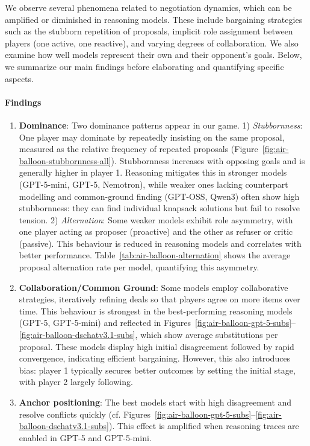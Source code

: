 \documentclass[../main.tex]{subfiles}
\begin{document}
We observe several phenomena related to negotiation dynamics, which can be amplified or diminished in reasoning models. These include bargaining strategies such as the stubborn repetition of proposals, implicit role assignment between players (one active, one reactive), and varying degrees of collaboration. We also examine how well models represent their own and their opponent’s goals. Below, we summarize our main findings before elaborating and quantifying specific aspects.

\paragraph{Findings}
\begin{enumerate}
    \item \textbf{Dominance}: Two dominance patterns appear in our game.  
    1) \emph{Stubbornness}: One player may dominate by repeatedly insisting on the same proposal, measured as the relative frequency of repeated proposals (Figure~\ref{fig:air-balloon-stubbornness-all}). Stubbornness increases with opposing goals and is generally higher in player 1. Reasoning mitigates this in stronger models (GPT-5-mini, GPT-5, Nemotron), while weaker ones lacking counterpart modelling and common-ground finding (GPT-OSS, Qwen3) often show high stubbornness: they can find individual knapsack solutions but fail to resolve tension.  
    2) \emph{Alternation}: Some weaker models exhibit role asymmetry, with one player acting as proposer (proactive) and the other as refuser or critic (passive). This behaviour is reduced in reasoning models and correlates with better performance. Table~\ref{tab:air-balloon-alternation} shows the average proposal alternation rate per model, quantifying this asymmetry.
    \item \textbf{Collaboration/Common Ground}: Some models employ collaborative strategies, iteratively refining deals so that players agree on more items over time. This behaviour is strongest in the best-performing reasoning models (GPT-5, GPT-5-mini) and reflected in Figures~\ref{fig:air-balloon-gpt-5-subs}--\ref{fig:air-balloon-dschatv3.1-subs}, which show average substitutions per proposal. These models display high initial disagreement followed by rapid convergence, indicating efficient bargaining. However, this also introduces bias: player 1 typically secures better outcomes by setting the initial stage, with player 2 largely following.
    \item \textbf{Anchor positioning}: The best models start with high disagreement and resolve conflicts quickly (cf. Figures~\ref{fig:air-balloon-gpt-5-subs}--\ref{fig:air-balloon-dschatv3.1-subs}). This effect is amplified when reasoning traces are enabled in GPT-5 and GPT-5-mini.

\end{enumerate}
\end{document}
